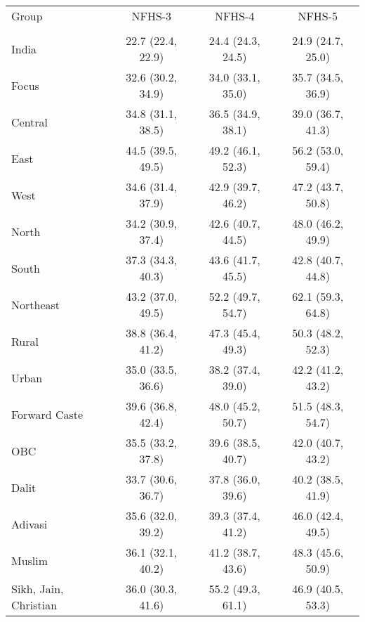 \begin{tabular}{lccc}
\toprule
Group & NFHS-3 & NFHS-4 & NFHS-5 \\\\
\midrule
India&22.7 (22.4, 22.9)&24.4 (24.3, 24.5)&24.9 (24.7, 25.0)\\
Focus&32.6 (30.2, 34.9)&34.0 (33.1, 35.0)&35.7 (34.5, 36.9)\\
Central&34.8 (31.1, 38.5)&36.5 (34.9, 38.1)&39.0 (36.7, 41.3)\\
East&44.5 (39.5, 49.5)&49.2 (46.1, 52.3)&56.2 (53.0, 59.4)\\
West&34.6 (31.4, 37.9)&42.9 (39.7, 46.2)&47.2 (43.7, 50.8)\\
North&34.2 (30.9, 37.4)&42.6 (40.7, 44.5)&48.0 (46.2, 49.9)\\
South&37.3 (34.3, 40.3)&43.6 (41.7, 45.5)&42.8 (40.7, 44.8)\\
Northeast&43.2 (37.0, 49.5)&52.2 (49.7, 54.7)&62.1 (59.3, 64.8)\\
Rural&38.8 (36.4, 41.2)&47.3 (45.4, 49.3)&50.3 (48.2, 52.3)\\
Urban&35.0 (33.5, 36.6)&38.2 (37.4, 39.0)&42.2 (41.2, 43.2)\\
Forward Caste&39.6 (36.8, 42.4)&48.0 (45.2, 50.7)&51.5 (48.3, 54.7)\\
OBC&35.5 (33.2, 37.8)&39.6 (38.5, 40.7)&42.0 (40.7, 43.2)\\
Dalit&33.7 (30.6, 36.7)&37.8 (36.0, 39.6)&40.2 (38.5, 41.9)\\
Adivasi&35.6 (32.0, 39.2)&39.3 (37.4, 41.2)&46.0 (42.4, 49.5)\\
Muslim&36.1 (32.1, 40.2)&41.2 (38.7, 43.6)&48.3 (45.6, 50.9)\\
Sikh, Jain, Christian&36.0 (30.3, 41.6)&55.2 (49.3, 61.1)&46.9 (40.5, 53.3)\\
\bottomrule
\end{tabular}
